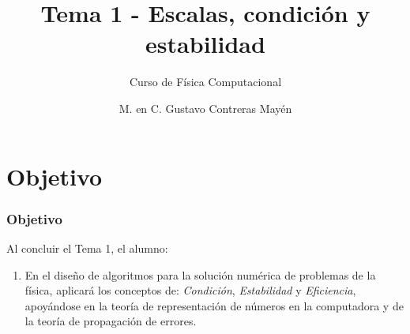
\usepackage{media9}
\usepackage{siunitx}
\usepackage{standalone}
\usepackage{longtable}
\newcommand*{\TitleParbox}[1]{\parbox[c]{6cm}{\raggedright #1}}%

\title{Tema 1 - Escalas, condición y estabilidad}
\subtitle{Curso de Física Computacional}
\author[]{M. en C. Gustavo Contreras Mayén}
\date{}

\maketitle
\fontsize{14}{14}\selectfont
{}
\section{Objetivo}
\begin{frame}
\frametitle{Objetivo}
Al concluir el Tema 1, el alumno:
\begin{enumerate}
\item En el diseño de algoritmos para la solución numérica de problemas de la física, aplicará los conceptos de: \textit{Condición}, \textit{Estabilidad} y \textit{Eficiencia}, apoyándose en la teoría de representación de números en la computadora y de la teoría de propagación de errores.
\end{enumerate}
\end{frame}
